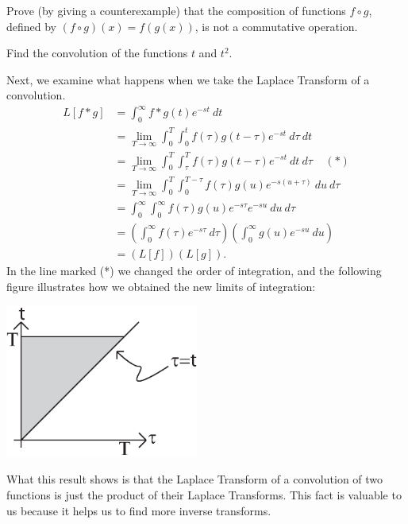 {{\begin{exe} 
Prove (by giving a counterexample) that the composition of functions $f \circ g$, defined by $(f \circ g)(x) = f(g(x))$, is not a commutative operation.
\end{exe}


\begin{exe} 
Find the convolution of the functions $t$ and $t^2$.
\end{exe}


Next, we examine what happens when we take the Laplace Transform of a convolution.
\begin{align*}
L[f*g] & = \int_0^\infty f*g(t) e^{-st} \ dt \\
& = \lim_{T \rightarrow \infty} \int_0^T \int_0^t f(\tau) g(t-\tau) e^{-st} \ d\tau \ dt \\
& = \lim_{T \rightarrow \infty} \int_0^T \int_\tau^T f(\tau) g(t-\tau) e^{-st} \ dt \ d\tau \ \ \ \ \ (*) \\
& = \lim_{T \rightarrow \infty} \int_0^T \int_0^{T-\tau} f(\tau)g(u)e^{-s(u+\tau)} \ du \ d\tau \\
& = \int_0^\infty \int_0^\infty f(\tau)g(u)e^{-s\tau}e^{-su} \ du \ d\tau \\
& = \left( \int_0^\infty f(\tau) e^{-s\tau} \ d\tau \right) \left( \int_0^\infty g(u) e^{-su} \ du \right) \\
& = (L[f])(L[g]).
\end{align*} 
In the line marked (*) we changed the order of integration, and the following figure illustrates how we obtained the new limits of integration:
\begin{center}
\includegraphics[width=2.5in]{12-representationformulas/convolutionfubini.eps}
\end{center}
What this result shows is that the Laplace Transform of a convolution of two functions is just the product of their Laplace Transforms.  This fact is valuable to us because it helps us to find more inverse transforms.


{\begin{center}
\end{center}}}}
